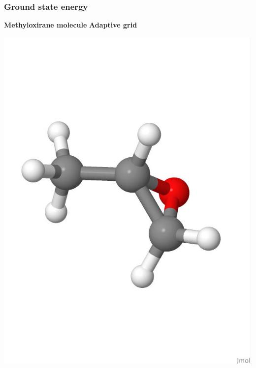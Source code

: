 \begin{frame}
\frametitle{Ground state energy}

\centering
\textbf{Methyloxirane molecule}
\hspace{30mm}
\textbf{Adaptive grid}
\begin{minipage}{0.5\textwidth}
\centering
\includegraphics[scale=0.15, viewport = 0 180 550 650, clip]{figures/methyloxirane_white.jpg}
\end{minipage}%
\begin{minipage}{0.5\textwidth}
\centering

\end{minipage}
\end{frame}
